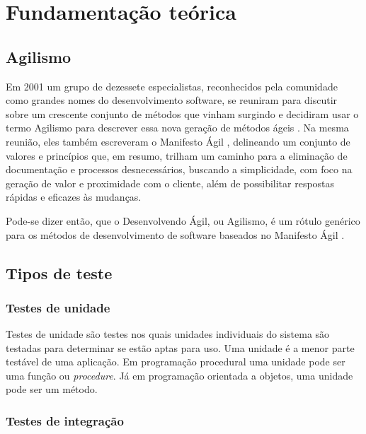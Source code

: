 \chapter{Fundamentação teórica}

\section{Agilismo}
\label{sec:agilismo}

Em 2001 um grupo de dezessete especialistas, reconhecidos pela comunidade como grandes nomes do desenvolvimento software, se reuniram para discutir sobre um crescente conjunto de métodos que vinham surgindo e decidiram usar o termo Agilismo para descrever essa nova geração de métodos ágeis \cite{AgileStory}. Na mesma reunião, eles também escreveram o Manifesto Ágil \cite{AgileManifesto}, delineando um conjunto de valores e princípios que, em resumo, trilham um caminho para a eliminação de documentação e processos desnecessários, buscando a simplicidade, com foco na geração de valor e proximidade com o cliente, além de possibilitar respostas rápidas e eficazes às mudanças.

Pode-se dizer então, que o Desenvolvendo Ágil, ou Agilismo, é um rótulo genérico para os métodos de desenvolvimento de software baseados no Manifesto Ágil \cite{BDDRodrigo}.


\section{Tipos de teste}
\label{sec:tipos_de_teste}

\subsection{Testes de unidade}
\label{sub:testes_de_unidade}

Testes de unidade são testes nos quais unidades individuais do sistema são testadas para determinar se estão aptas para uso. Uma unidade é a menor parte testável de uma aplicação. Em programação procedural uma unidade pode ser uma função ou \textit{procedure}. Já em programação orientada a objetos, uma unidade pode ser um método.


\subsection{Testes de integração}
\label{sub:testes_de_integracao}

